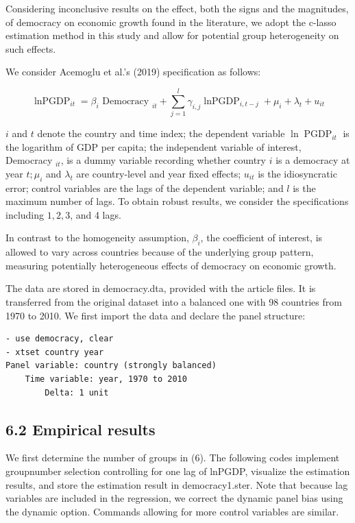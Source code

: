 \documentclass[10pt]{article}
\begin{document}
Considering inconclusive results on the effect, both the signs and the magnitudes, of democracy on economic growth found in the literature, we adopt the c-lasso estimation method in this study and allow for potential group heterogeneity on such effects.

We consider Acemoglu et al.'s (2019) specification as follows:


\begin{equation*}
\operatorname{lnPGDP}_{i t}=\beta_{i} \text { Democracy }_{i t}+\sum_{j=1}^{l} \gamma_{i, j} \operatorname{lnPGDP}_{i, t-j}+\mu_{i}+\lambda_{t}+u_{i t} \tag{6}
\end{equation*}


$i$ and $t$ denote the country and time index; the dependent variable $\ln \operatorname{PGDP}_{i t}$ is the logarithm of GDP per capita; the independent variable of interest, Democracy ${ }_{i t}$, is a dummy variable recording whether country $i$ is a democracy at year $t ; \mu_{i}$ and $\lambda_{t}$ are country-level and year fixed effects; $u_{i t}$ is the idiosyncratic error; control variables are the lags of the dependent variable; and $l$ is the maximum number of lags. To obtain robust results, we consider the specifications including $1,2,3$, and 4 lags.

In contrast to the homogeneity assumption, $\beta_{i}$, the coefficient of interest, is allowed to vary across countries because of the underlying group pattern, measuring potentially heterogeneous effects of democracy on economic growth.

The data are stored in democracy.dta, provided with the article files. It is transferred from the original dataset into a balanced one with 98 countries from 1970 to 2010. We first import the data and declare the panel structure:

\begin{verbatim}
- use democracy, clear
- xtset country year
Panel variable: country (strongly balanced)
    Time variable: year, 1970 to 2010
        Delta: 1 unit
\end{verbatim}

\subsection*{6.2 Empirical results}
We first determine the number of groups in (6). The following codes implement groupnumber selection controlling for one lag of lnPGDP, visualize the estimation results, and store the estimation result in democracy1.ster. Note that because lag variables are included in the regression, we correct the dynamic panel bias using the dynamic option. Commands allowing for more control variables are similar.
\end{document}
